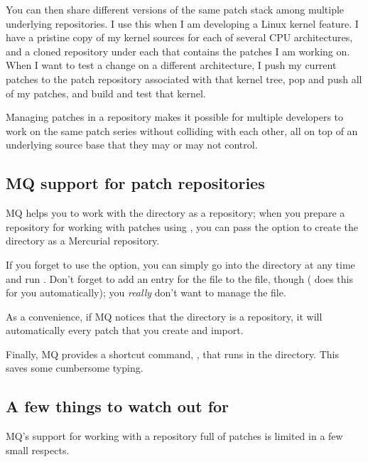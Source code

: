 You can then share different versions of the same patch stack among
multiple underlying repositories.  I use this when I am developing a
Linux kernel feature.  I have a pristine copy of my kernel sources for
each of several CPU architectures, and a cloned repository under each
that contains the patches I am working on.  When I want to test a
change on a different architecture, I push my current patches to the
patch repository associated with that kernel tree, pop and push all of
my patches, and build and test that kernel.

Managing patches in a repository makes it possible for multiple
developers to work on the same patch series without colliding with
each other, all on top of an underlying source base that they may or
may not control.

\subsection{MQ support for patch repositories}

MQ helps you to work with the  directory as a
repository; when you prepare a repository for working with patches
using , you can pass the  option to
create the  directory as a Mercurial repository.

\begin{note}
  If you forget to use the  option, you can simply go
  into the  directory at any time and run
  .  Don't forget to add an entry for the
   file to the  file, though
  ( does this for you
  automatically); you \emph{really} don't want to manage the
   file.
\end{note}

As a convenience, if MQ notices that the 
directory is a repository, it will automatically  every
patch that you create and import.

Finally, MQ provides a shortcut command, , that runs
 in the  directory.  This saves
some cumbersome typing.

\subsection{A few things to watch out for}

MQ's support for working with a repository full of patches is limited
in a few small respects.

